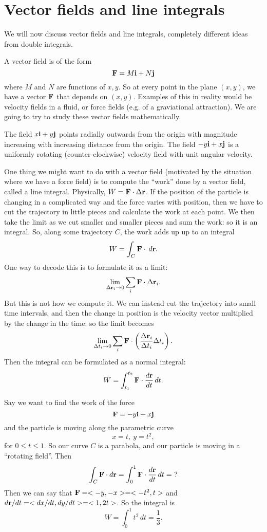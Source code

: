 \section{Vector fields and line integrals}

We will now discuss vector fields and line integrals, completely different ideas from double integrals.

A vector field is of the form
\[ \boldsymbol{\mathbf{F}} = M\boldsymbol{\mathbf{i}}+N\boldsymbol{\mathbf{j}} \]
where $M$ and $N$ are functions of $x,y$. So at every point in the plane $(x,y)$, we have a vector $\boldsymbol{\mathbf{F}}$ that depends on $(x,y)$. Examples of this in reality would be velocity fields in a fluid, or force fields (e.g. of a graviational attraction). We are going to try to study these vector fields mathematically.

\bex
The field $x\boldsymbol{\mathbf{i}}+y\boldsymbol{\mathbf{j}}$ points radially outwards from the origin with magnitude increasing with increasing distance from the origin. The field $-y\boldsymbol{\mathbf{i}}+x\boldsymbol{\mathbf{j}}$ is a uniformly rotating (counter-clockwise) velocity field with unit angular velocity.
\eex

One thing we might want to do with a vector field (motivated by the situation where we have a force field) is to compute the ``work'' done by a vector field, called a line integral. Physically, $W = \boldsymbol{\mathbf{F}}\cdot\Delta \boldsymbol{\mathbf{r}}$. If the position of the particle is changing in a complicated way and the force varies with position, then we have to cut the trajectory in little pieces and calculate the work at each point. We then take the limit as we cut smaller and smaller pieces and sum the work: so it is an integral. So, along some trajectory $C$, the work adds up up to an integral 
\[ W = \int_C \boldsymbol{\mathbf{F}}\cdot\, d\boldsymbol{\mathbf{r}}. \]
One way to decode this is to formulate it as a limit:
\[ \lim_{\Delta \boldsymbol{\mathbf{r}}_i \to 0} \sum_i \boldsymbol{\mathbf{F}} \cdot \Delta \boldsymbol{\mathbf{r}}_i. \]
But this is not how we compute it. We can instead cut the trajectory into small time intervals, and then the change in position is the velocity vector multiplied by the change in the time: so the limit becomes 
\[ \lim_{\Delta t_i \to 0} \sum_i \boldsymbol{\mathbf{F}} \cdot \left( \frac{\Delta \boldsymbol{\mathbf{r}}_i}{\Delta t_i}\Delta t_i\right). \]
Then the integral can be formulated as a normal integral:
\[ W = \int_{t_1}^{t_2} \boldsymbol{\mathbf{F}} \cdot \frac{d\boldsymbol{\mathbf{r}}}{dt}\,dt. \]

\bex
Say we want to find the work of the force
\[ \boldsymbol{\mathbf{F}} = -y\boldsymbol{\mathbf{i}}+x\boldsymbol{\mathbf{j}} \]
and the particle is moving along the parametric curve
\[ x = t,\ y = t^2, \]
for $0 \le t \le 1$. So our curve $C$ is a parabola, and our particle is moving in a ``rotating field''. Then
\[ \int_C \boldsymbol{\mathbf{F}} \cdot d\boldsymbol{\mathbf{r}} = \int_0^1 \boldsymbol{\mathbf{F}} \cdot \frac{d\boldsymbol{\mathbf{r}}}{dt}\, dt =\ ?\]
Then we can say that $\boldsymbol{\mathbf{F}} = <-y,-x>=<-t^2,t>$ and $d\boldsymbol{\mathbf{r}}/dt=<dx/dt,dy/dt>=<1,2t>$. So the integral is
\[ W = \int_0^1 t^2\,dt = \frac 13. \]
\eex

